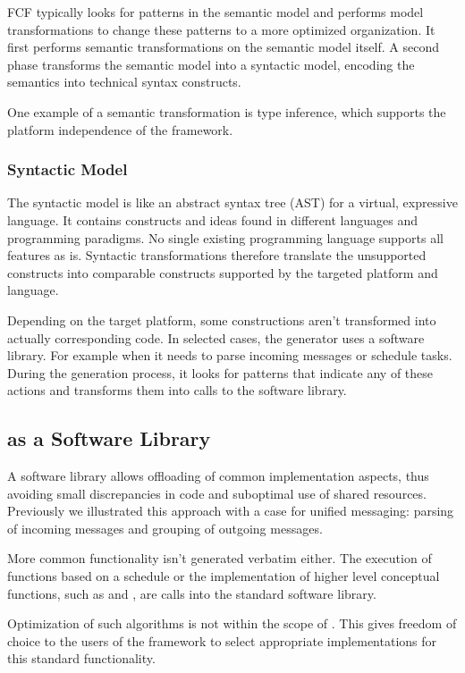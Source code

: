 \documentclass[3p,times,procedia]{elsarticle}
\begin{document}
FCF typically looks for patterns in the semantic model and performs model
transformations to change these patterns to a more optimized organization. It
first performs semantic transformations on the semantic model itself. A second
phase transforms the semantic model into a syntactic model, encoding the
semantics into technical syntax constructs.

One example of a semantic transformation is type inference, which supports the
platform independence of the framework.

\subsubsection{Syntactic Model}

The syntactic model is like an abstract syntax tree (AST) for a virtual,
expressive language. It contains constructs and ideas found in different
languages and programming paradigms. No single existing programming language
supports all features as is. Syntactic transformations therefore translate the
unsupported constructs into comparable constructs supported by the targeted
platform and language.

Depending on the target platform, some constructions aren't transformed into
actually corresponding code. In selected cases, the generator uses a software
library. For example when it needs to parse incoming messages or schedule
tasks. During the generation process, it looks for patterns that indicate any
of these actions and transforms them into calls to the \NAME software library.

\subsection{\NAME as a Software Library}
\label{software-lib-design}

A software library allows offloading of common implementation aspects, thus
avoiding small discrepancies in code and suboptimal use of shared resources.
Previously we illustrated this approach with a case for unified messaging:
parsing of incoming messages and grouping of outgoing messages.

More common functionality isn't generated verbatim either. The execution of
functions based on a schedule or the implementation of higher level conceptual
functions, such as  and , are calls into the standard
software library.

Optimization of such algorithms is not within the scope of \NAME. This gives
freedom of choice to the users of the framework to select appropriate
implementations for this standard functionality.
\end{document}
